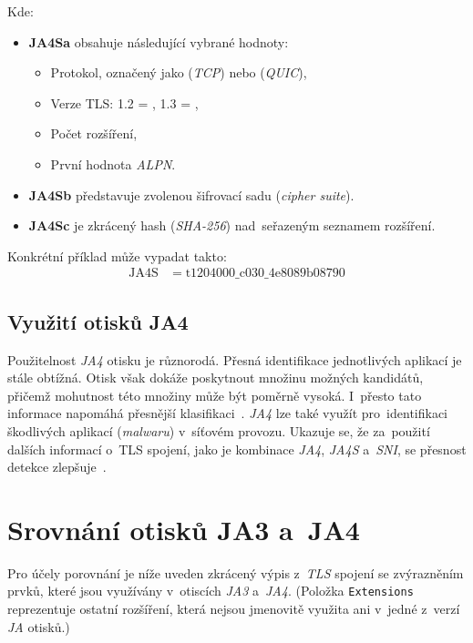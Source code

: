 Kde:
\begin{itemize}
	\item \textbf{JA4Sa} obsahuje následující vybrané hodnoty:
	      \begin{itemize}
	      	\item Protokol, označený jako \texttt{} (\textit{TCP}) nebo \texttt{} (\textit{QUIC}),
	      	\item Verze TLS: 1.2 = \texttt{}, 1.3 = \texttt{},
	      	\item Počet rozšíření,
	      	\item První hodnota \textit{ALPN}.
	      \end{itemize}
	      	      
	\item \textbf{JA4Sb} představuje zvolenou šifrovací sadu (\textit{cipher suite}).
	      	      
	\item \textbf{JA4Sc} je zkrácený hash (\textit{SHA-256}) nad~seřazeným seznamem rozšíření.
\end{itemize}

Konkrétní příklad může vypadat takto:
\[
	\begin{aligned}
		\text{JA4S} & = \text{t1204000} \_ \text{c030} \_ \text{4e8089b08790} 
	\end{aligned}
\]

\subsection{Využití otisků JA4}
Použitelnost \textit{JA4} otisku je různorodá. Přesná identifikace jednotlivých aplikací je stále obtížná. Otisk však dokáže poskytnout množinu možných kandidátů, přičemž mohutnost této množiny může být poměrně vysoká. I~přesto tato informace napomáhá přesnější klasifikaci~\cite{BurgetovaJA42024}. \textit{JA4} lze také využít pro~identifikaci škodlivých aplikací (\textit{malwaru}) v~síťovém provozu. Ukazuje se, že za~použití dalších informací o~TLS spojení, jako je kombinace \textit{JA4}, \textit{JA4S} a~\textit{SNI}, se přesnost detekce zlepšuje~\cite{MatousekJA4Malware2024}.

\section{Srovnání otisků JA3 a~JA4}
\label{sec:compJA34}
Pro účely porovnání je níže uveden zkrácený výpis z~\textit{TLS} spojení se zvýrazněním prvků, které jsou využívány v~otiscích \textit{JA3} a~\textit{JA4}. (Položka \texttt{Extensions} reprezentuje ostatní rozšíření, která nejsou jmenovitě využita ani v~jedné z~verzí \textit{JA} otisků.)

